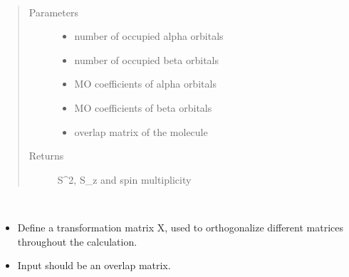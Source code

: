 \documentclass[letterpaper,10pt,english]{sphinxmanual}
\begin{document}
\begin{fulllineitems}
\label{\detokenize{SCF_functions:ghf.SCF_functions.spin}}~\begin{quote}\begin{description}
\item[{Parameters}] \leavevmode\begin{itemize}
\item {} 
 \textendash{} number of occupied alpha orbitals

\item {} 
 \textendash{} number of occupied beta orbitals

\item {} 
 \textendash{} MO coefficients of alpha orbitals

\item {} 
 \textendash{} MO coefficients of beta orbitals

\item {} 
 \textendash{} overlap matrix of the molecule

\end{itemize}

\item[{Returns}] \leavevmode
S\textasciicircum{}2, S\_z and spin multiplicity

\end{description}\end{quote}

\end{fulllineitems}


\begin{fulllineitems}
\label{\detokenize{SCF_functions:ghf.SCF_functions.trans_matrix}}~\begin{itemize}
\item {} 
Define a transformation matrix X, used to orthogonalize different matrices throughout the calculation.

\item {} 
Input should be an overlap matrix.

\end{itemize}

\end{fulllineitems}
\end{document}
